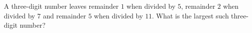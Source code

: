 A three-digit number leaves remainder $1$ when divided by $5$, remainder $2$ when divided by $7$ and remainder $5$ when divided by $11$. What is the largest such three-digit number?
